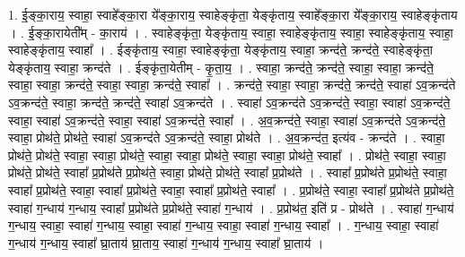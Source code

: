 \documentclass[17pt]{extarticle}
\begin{document}
1. ई॒ङ्का॒राय॒ स्वाहा॒ स्वाहे᳚ङ्का॒रा ये᳚ङ्का॒राय॒ स्वाहेङ्कृ॑ता॒ येङ्कृ॑ताय॒ स्वाहे᳚ङ्का॒रा ये᳚ङ्का॒राय॒ स्वाहेङ्कृ॑ताय । . ई॒ङ्का॒रायेती᳚म् - का॒राय॑ । . स्वाहेङ्कृ॑ता॒ येङ्कृ॑ताय॒ स्वाहा॒ स्वाहेङ्कृ॑ताय॒ स्वाहा॒ स्वाहेङ्कृ॑ताय॒ स्वाहा॒ स्वाहेङ्कृ॑ताय॒ स्वाहा᳚ । . ईङ्कृ॑ताय॒ स्वाहा॒ स्वाहेङ्कृ॑ता॒ येङ्कृ॑ताय॒ स्वाहा॒ क्रन्द॑ते॒ क्रन्द॑ते॒ स्वाहेङ्कृ॑ता॒ येङ्कृ॑ताय॒ स्वाहा॒ क्रन्द॑ते । . ईङ्कृ॑ता॒येतीम् - कृ॒ता॒य॒ । . स्वाहा॒ क्रन्द॑ते॒ क्रन्द॑ते॒ स्वाहा॒ स्वाहा॒ क्रन्द॑ते॒ स्वाहा॒ स्वाहा॒ क्रन्द॑ते॒ स्वाहा॒ स्वाहा॒ क्रन्द॑ते॒ स्वाहा᳚ । . क्रन्द॑ते॒ स्वाहा॒ स्वाहा॒ क्रन्द॑ते॒ क्रन्द॑ते॒ स्वाहा॑ ऽव॒क्रन्द॑ते ऽव॒क्रन्द॑ते॒ स्वाहा॒ क्रन्द॑ते॒ क्रन्द॑ते॒ स्वाहा॑ ऽव॒क्रन्द॑ते । . स्वाहा॑ ऽव॒क्रन्द॑ते ऽव॒क्रन्द॑ते॒ स्वाहा॒ स्वाहा॑ ऽव॒क्रन्द॑ते॒ स्वाहा॒ स्वाहा॑ ऽव॒क्रन्द॑ते॒ स्वाहा॒ स्वाहा॑ ऽव॒क्रन्द॑ते॒ स्वाहा᳚ । . अ॒व॒क्रन्द॑ते॒ स्वाहा॒ स्वाहा॑ ऽव॒क्रन्द॑ते ऽव॒क्रन्द॑ते॒ स्वाहा॒ प्रोथ॑ते॒ प्रोथ॑ते॒ स्वाहा॑ ऽव॒क्रन्द॑ते ऽव॒क्रन्द॑ते॒ स्वाहा॒ प्रोथ॑ते । . अ॒व॒क्रन्द॑त॒ इत्य॑व - क्रन्द॑ते । . स्वाहा॒ प्रोथ॑ते॒ प्रोथ॑ते॒ स्वाहा॒ स्वाहा॒ प्रोथ॑ते॒ स्वाहा॒ स्वाहा॒ प्रोथ॑ते॒ स्वाहा॒ स्वाहा॒ प्रोथ॑ते॒ स्वाहा᳚ । . प्रोथ॑ते॒ स्वाहा॒ स्वाहा॒ प्रोथ॑ते॒ प्रोथ॑ते॒ स्वाहा᳚ प्र॒प्रोथ॑ते प्र॒प्रोथ॑ते॒ स्वाहा॒ प्रोथ॑ते॒ प्रोथ॑ते॒ स्वाहा᳚ प्र॒प्रोथ॑ते । . स्वाहा᳚ प्र॒प्रोथ॑ते प्र॒प्रोथ॑ते॒ स्वाहा॒ स्वाहा᳚ प्र॒प्रोथ॑ते॒ स्वाहा॒ स्वाहा᳚ प्र॒प्रोथ॑ते॒ स्वाहा॒ स्वाहा᳚ प्र॒प्रोथ॑ते॒ स्वाहा᳚ । . प्र॒प्रोथ॑ते॒ स्वाहा॒ स्वाहा᳚ प्र॒प्रोथ॑ते प्र॒प्रोथ॑ते॒ स्वाहा॑ ग॒न्धाय॑ ग॒न्धाय॒ स्वाहा᳚ प्र॒प्रोथ॑ते प्र॒प्रोथ॑ते॒ स्वाहा॑ ग॒न्धाय॑ । . प्र॒प्रोथ॑त॒ इति॑ प्र - प्रोथ॑ते । . स्वाहा॑ ग॒न्धाय॑ ग॒न्धाय॒ स्वाहा॒ स्वाहा॑ ग॒न्धाय॒ स्वाहा॒ स्वाहा॑ ग॒न्धाय॒ स्वाहा॒ स्वाहा॑ ग॒न्धाय॒ स्वाहा᳚ । . ग॒न्धाय॒ स्वाहा॒ स्वाहा॑ ग॒न्धाय॑ ग॒न्धाय॒ स्वाहा᳚ घ्रा॒ताय॑ घ्रा॒ताय॒ स्वाहा॑ ग॒न्धाय॑ ग॒न्धाय॒ स्वाहा᳚ घ्रा॒ताय॑ । \newline
\end{document}
